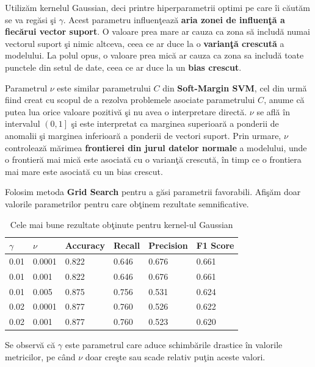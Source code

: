 Utilizăm kernelul Gaussian, deci printre hiperparametrii optimi pe care îi căutăm 
se va regăsi şi $\gamma$. Acest parametru influenţează 
\textbf{aria zonei de influenţă a 
fiecărui vector suport}. O valoare prea mare ar cauza ca zona să includă numai 
vectorul suport şi nimic altceva, ceea ce ar duce la o \textbf{varianţă crescută} 
a modelului. La polul opus, o valoare prea mică ar cauza ca zona sa includă 
toate punctele din setul de date, ceea ce ar duce la un \textbf{bias crescut}.

Parametrul $\nu$ este similar parametrului $C$ din \textbf{Soft-Margin SVM}, 
cel din urmă
fiind creat cu scopul de a rezolva problemele asociate parametrului $C$, anume că 
putea lua orice valoare pozitivă şi nu avea o interpretare directă. $\nu$ se află 
în intervalul $\left(0, 1\right]$ şi este interpretat ca marginea superioară a ponderii de anomalii 
şi marginea inferioară a ponderii de vectori suport. Prin urmare, $\nu$ controlează
mărimea \textbf{frontierei din jurul datelor normale} a modelului, 
unde o frontieră mai mică este asociată
cu o varianţă crescută, în timp ce o frontiera mai mare este asociată cu un bias 
crescut.

Folosim metoda \textbf{Grid Search} pentru a găsi parametrii favorabili. Afişăm 
doar valorile parametrilor pentru care obţinem rezultate semnificative.

\begin{table}[H]
  \centering
  \begin{tabularx}{\textwidth}{
      |X
      |X
      |X
      |X
      |X
      |X|
  }
  \hline
  $\gamma$ & $\nu$ & {Accuracy} & {Recall} & {Precision} & {F1 Score} \\
  \hline
  \rowcolor{gray!20} 0.01 &  0.0001	&  0.822 &  0.646	&  0.676	&  0.661  \\
  0.01	&  0.001 &  0.822	&  0.646	&  0.676	&  0.661 \\
  \rowcolor{gray!20} 0.01 & 0.005 &  0.875 &  0.756	&  0.531	&  0.624  \\
  0.02 & 0.0001	& 0.877 &  0.760 &  0.526	&  0.622 \\
  \rowcolor{gray!20} 0.02 &  0.001	&  0.877 & 0.760 &  0.523	&  0.620 \\
  \hline
  \end{tabularx}
  \caption{Cele mai bune rezultate obţinute pentru kernel-ul Gaussian}
\end{table}

Se observă că $\gamma$ este parametrul care aduce schimbările drastice în valorile 
metricilor, pe când $\nu$ doar creşte sau scade relativ puţin aceste valori.

